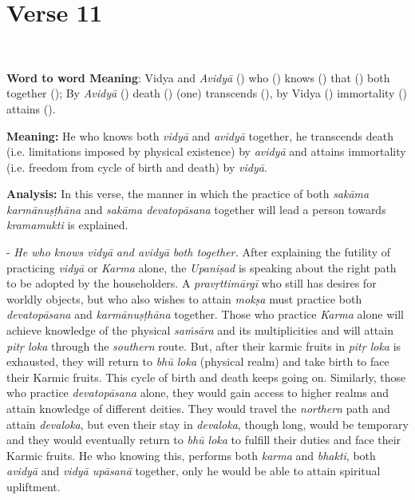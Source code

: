 \chapter{Verse 11}

\begin{moolashloka}
\\
\end{moolashloka}

\textbf{Word to word Meaning}: Vidya and \emph{Avidyā} () who () knows () that () both together (); By \emph{Avidyā} () death () (one) transcends (), by Vidya () immortality () attains ().

\textbf{Meaning:} He who knows both \emph{vidyā} and \emph{avidyā} together, he transcends death (i.e. limitations imposed by physical existence) by \emph{avidyā} and attains immortality (i.e. freedom from cycle of birth and death) by \emph{vidyā}.

\textbf{Analysis:} In this verse, the manner in which the practice of both \emph{sakāma karmānuṣṭhāna} and \emph{sakāma devatopāsana} together will lead a person towards \emph{kramamukti} is explained.

- \emph{He who knows vidyā} \emph{and avidyā} \emph{both together.} After explaining the futility of practicing \emph{vidyā} or \emph{Karma} alone, the \emph{Upaniṣad} is speaking about the right path to be adopted by the householders. A \emph{pravṛttimārgī} who still has desires for worldly objects, but who also wishes to attain \emph{mokṣa} must practice both \emph{devatopāsana} and \emph{karmānuṣṭhāna} together. Those who practice \emph{Karma} alone will achieve knowledge of the physical \emph{saṁsāra} and its multiplicities and will attain \emph{pitṛ loka} through the \emph{southern} route. But, after their karmic fruits in \emph{pitṛ loka} is exhausted, they will return to \emph{bhū loka} (physical realm) and take birth to face their Karmic fruits. This cycle of birth and death keeps going on. Similarly, those who practice \emph{devatopāsana} alone, they would gain access to higher realms and attain knowledge of different deities. They would travel the \emph{northern} path and attain \emph{devaloka}, but even their stay in \emph{devaloka}, though long, would be temporary and they would eventually return to \emph{bhū loka} to fulfill their duties and face their Karmic fruits. He who knowing this, performs both \emph{karma} and \emph{bhakti}, both \emph{avidyā} and \emph{vidyā upāsanā} together, only he would be able to attain spiritual upliftment.

